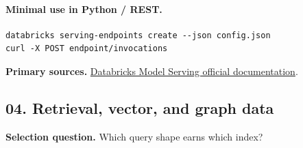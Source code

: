 \paragraph{Minimal use in Python / REST.}
\begin{Verbatim}[fontsize=\scriptsize]
databricks serving-endpoints create --json config.json
curl -X POST endpoint/invocations
\end{Verbatim}
\textbf{Primary sources.} \href{https://docs.databricks.com/aws/en/machine-learning/model-serving/}{Databricks Model Serving official documentation}.
\clearpage\subsection{04. Retrieval, vector, and graph data}
\textbf{Selection question.} Which query shape earns which index?
\begin{center}\end{center}

